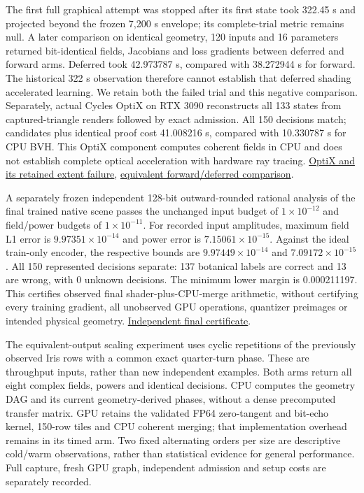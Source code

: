 \documentclass[11pt]{article}
\begin{document}
The first full graphical attempt was stopped after its first state took 322.45 s and projected beyond the frozen 7,200 s envelope; its complete-trial metric remains null. A later comparison on identical geometry, 120 inputs and 16 parameters returned bit-identical fields, Jacobians and loss gradients between deferred and forward arms. Deferred took 42.973787 s, compared with 38.272944 s for forward. The historical 322 s observation therefore cannot establish that deferred shading accelerated learning. We retain both the failed trial and this negative comparison. Separately, actual Cycles OptiX on RTX 3090 reconstructs all 133 states from captured-triangle renders followed by exact admission. All 150 decisions match; candidates plus identical proof cost 41.008216 s, compared with 10.330787 s for CPU BVH. This OptiX component computes coherent fields in CPU and does not establish complete optical acceleration with hardware ray tracing. \href{https://github.com/Agnuxo1/Neuro3D/blob/a6d0fbec5011bdc76abad71edac86519016348f4/Docs/NATIVE\_CYCLES\_OPTIX\_COMPONENT\_V2\_PROTOCOL\_2026-10-09.md}{OptiX and its retained extent failure}, \href{https://github.com/Agnuxo1/Neuro3D/blob/a6d0fbec5011bdc76abad71edac86519016348f4/Docs/NATIVE\_DEFERRED\_GRAPHICS\_STATE\_PROTOCOL\_2026-10-09.md}{equivalent forward/deferred comparison}.

A separately frozen independent 128-bit outward-rounded rational analysis of the final trained native scene passes the unchanged input budget of $1\times10^{-12}$ and field/power budgets of $1\times10^{-11}$. For recorded input amplitudes, maximum field L1 error is $9.97351\times10^{-14}$ and power error is $7.15061\times10^{-15}$. Against the ideal train-only encoder, the respective bounds are $9.97449\times10^{-14}$ and $7.09172\times10^{-15}$. All 150 represented decisions separate: 137 botanical labels are correct and 13 are wrong, with 0 unknown decisions. The minimum lower margin is 0.000211197. This certifies observed final shader-plus-CPU-merge arithmetic, without certifying every training gradient, all unobserved GPU operations, quantizer preimages or intended physical geometry. \href{https://github.com/Agnuxo1/Neuro3D/blob/a6d0fbec5011bdc76abad71edac86519016348f4/Docs/NATIVE\_DEFERRED\_TRAINING\_FIELD\_CERTIFICATE\_PROTOCOL\_2026-10-09.md}{Independent final certificate}.

The equivalent-output scaling experiment uses cyclic repetitions of the previously observed Iris rows with a common exact quarter-turn phase. These are throughput inputs, rather than new independent examples. Both arms return all eight complex fields, powers and identical decisions. CPU computes the geometry DAG and its current geometry-derived phases, without a dense precomputed transfer matrix. GPU retains the validated FP64 zero-tangent and bit-echo kernel, 150-row tiles and CPU coherent merging; that implementation overhead remains in its timed arm. Two fixed alternating orders per size are descriptive cold/warm observations, rather than statistical evidence for general performance. Full capture, fresh GPU graph, independent admission and setup costs are separately recorded.
\end{document}
